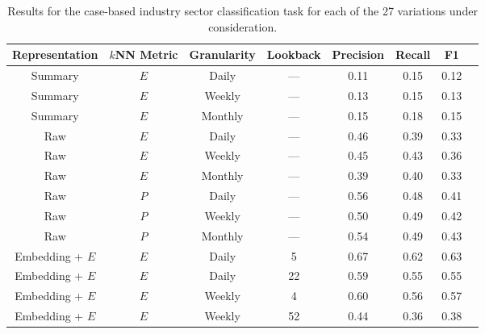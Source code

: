 \documentclass[runningheads]{llncs}
\begin{document}
\begin{table}[!tb]
    \centering
    \caption{Results for the case-based industry sector classification task for each of the 27 variations under consideration.}
    \label{tab:classification_results}
    \begin{tabular}{cccccccc}
    \toprule
        \textbf{Representation} & \hspace{0.07cm}\textbf{$k$NN Metric}\hspace{0.07cm} & \textbf{Granularity} &\hspace{0.07cm}\textbf{Lookback} &\hspace{0.07cm}\textbf{Precision} & \hspace{0.07cm}\textbf{Recall} & \hspace{0.07cm}\textbf{F1} \\
        \midrule
        Summary & $E$ & Daily & --- & 0.11 & 0.15 & 0.12   \\
        Summary & $E$ & Weekly & --- & 0.13 & 0.15 & 0.13   \\
        Summary & $E$ & Monthly & --- & 0.15 & 0.18 & 0.15  \\
        \midrule
        Raw & $E$ & Daily & --- & 0.46 & 0.39 & 0.33  \\
        Raw & $E$ & Weekly & --- & 0.45 & 0.43 & 0.36  \\
        Raw & $E$ & Monthly & --- & 0.39 & 0.40 & 0.33  \\
        \midrule
        Raw & $P$ & Daily & --- & 0.56 & 0.48 & 0.41  \\
        Raw & $P$ & Weekly & --- & 0.50 & 0.49 & 0.42  \\
        Raw & $P$ & Monthly & --- & 0.54 & 0.49 & 0.43  \\
        \midrule
        Embedding + $E$ & $E$ & Daily & 5 & 0.67& 0.62 & 0.63   \\
        Embedding + $E$ & $E$ & Daily & 22 & 0.59 & 0.55 & 0.55  \\
        Embedding + $E$ & $E$ & Weekly & 4 & 0.60 & 0.56 & 0.57  \\
        Embedding + $E$ & $E$ & Weekly & 52 & 0.44 & 0.36 & 0.38  \\

\end{tabular}
\end{table}
\end{document}
